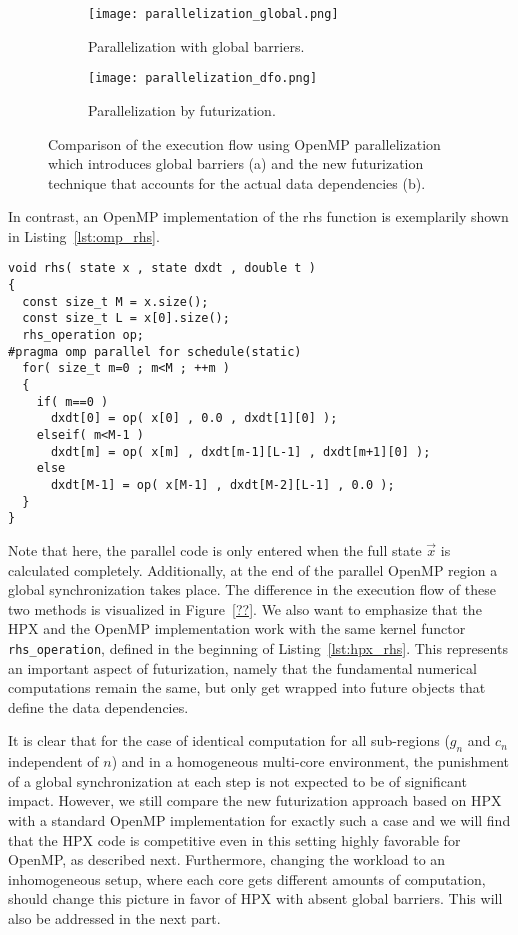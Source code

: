 \documentclass[10pt]{elsarticle}
\begin{document}
\begin{figure}
 \begin{subfigure}[b]{0.49\textwidth}
  \centering
  \texttt{[image: parallelization\_global.png]}
  \caption{Parallelization with global barriers.}
  \label{fig:par_glob_bar}
 \end{subfigure}
 \begin{subfigure}[b]{0.49\textwidth}
  \centering
  \texttt{[image: parallelization\_dfo.png]}
  \caption{Parallelization by futurization.}
  \label{fig:par_fut}
 \end{subfigure}
 \caption{Comparison of the execution flow using OpenMP parallelization which introduces global barriers (a) and the new futurization technique that accounts for the actual data dependencies (b).} 
 \label{fig:parallelization}
\end{figure}

In contrast, an OpenMP implementation of the rhs function is exemplarily shown in Listing~\ref{lst:omp_rhs}.
\begin{lstlisting}[label=lst:omp_rhs,caption=OpenMP rhs function,float=t]
void rhs( state x , state dxdt , double t )
{
  const size_t M = x.size();
  const size_t L = x[0].size();
  rhs_operation op;
#pragma omp parallel for schedule(static)
  for( size_t m=0 ; m<M ; ++m )
  {
    if( m==0 )
      dxdt[0] = op( x[0] , 0.0 , dxdt[1][0] );
    elseif( m<M-1 )
      dxdt[m] = op( x[m] , dxdt[m-1][L-1] , dxdt[m+1][0] );
    else
      dxdt[M-1] = op( x[M-1] , dxdt[M-2][L-1] , 0.0 );
  }
}
\end{lstlisting}
Note that here, the parallel code is only entered when the full state $\vec x$ is calculated completely.
Additionally, at the end of the parallel OpenMP region a global synchronization takes place.
The difference in the execution flow of these two methods is visualized in Figure~\ref{??}.
We also want to emphasize that the HPX and the OpenMP implementation work with the same kernel functor \lstinline+rhs_operation+, defined in the beginning of Listing~\ref{lst:hpx_rhs}.
This represents an important aspect of futurization, namely that the fundamental numerical computations remain the same, but only get wrapped into future objects that define the data dependencies.

It is clear that for the case of identical computation for all sub-regions ($g_n$ and $c_n$ independent of $n$) and in a homogeneous multi-core environment, the punishment of a global synchronization at each step is not expected to be of significant impact.
However, we still compare the new futurization approach based on HPX with a standard OpenMP implementation for exactly such a case and we will find that the HPX code is competitive even in this setting highly favorable for OpenMP, as described next.
Furthermore, changing the workload to an inhomogeneous setup, where each core gets different amounts of computation, should change this picture in favor of HPX with absent global barriers.
This will also be addressed in the next part.
\end{document}
